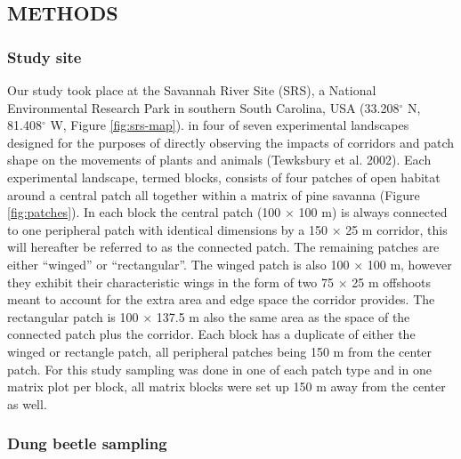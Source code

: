 \documentclass[
  man, donotrepeattitle]{apa6}
\begin{document}
\subsection{METHODS}\label{methods}

\subsubsection{Study site}\label{study-site}

Our study took place at the Savannah River Site (SRS), a National Environmental Research Park in southern South Carolina, USA (33.208\(^\circ\) N, 81.408\(^\circ\) W, Figure \ref{fig:srs-map}). in four of seven experimental landscapes designed for the purposes of directly observing the impacts of corridors and patch shape on the movements of plants and animals (Tewksbury et al. 2002). Each experimental landscape, termed blocks, consists of four patches of open habitat around a central patch all together within a matrix of pine savanna (Figure \ref{fig:patches}). In each block the central patch (100 \(\times\) 100 m) is always connected to one peripheral patch with identical dimensions by a 150 \(\times\) 25 m corridor, this will hereafter be referred to as the connected patch. The remaining patches are either ``winged'' or ``rectangular''. The winged patch is also 100 \(\times\) 100 m, however they exhibit their characteristic wings in the form of two 75 \(\times\) 25 m offshoots meant to account for the extra area and edge space the corridor provides. The rectangular patch is 100 \(\times\) 137.5 m also the same area as the space of the connected patch plus the corridor. Each block has a duplicate of either the winged or rectangle patch, all peripheral patches being 150 m from the center patch. For this study sampling was done in one of each patch type and in one matrix plot per block, all matrix blocks were set up 150 m away from the center as well.

\subsubsection{Dung beetle sampling}\label{dung-beetle-sampling}
\end{document}
